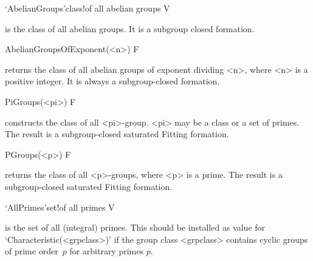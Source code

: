 \>`AbelianGroups'{class}!{of all abelian groups} V

%
is the class of all abelian groups. It is a subgroup closed formation.




\>AbelianGroupsOfExponent(<n>) F

returns the class of all abelian groups of exponent dividing <n>, where <n> is
a positive integer. It is always a subgroup-closed formation.


\>PiGroups(<pi>) F

constructs the class of all <pi>-group.  <pi> may be a class or a set of
primes. The result is a subgroup-closed saturated Fitting formation.


\>PGroups(<p>) F

returns the class of all <p>-groups, where <p> is a prime.  The result is a
subgroup-closed saturated Fitting formation.


\>`AllPrimes'{set}!{of all primes} V

%
\label{AllPrimes}%
is the set of all (integral) primes. This should be
installed as value for `Characteristic(<grpclass>)' if the group class
<grpclass> contains cyclic groups of prime order~$p$ for arbitrary primes $p$.



